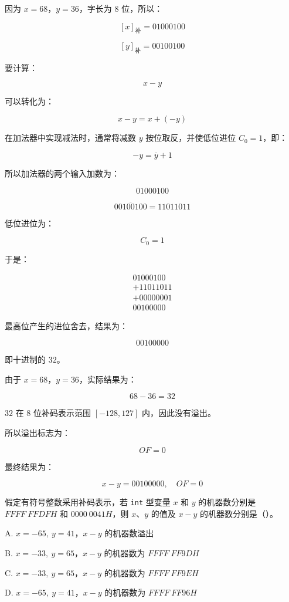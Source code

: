 \begin{analysisenv}
因为 $x=68$，$y=36$，字长为 $8$ 位，所以：

\[
[x]_{\text{补}} = 01000100
\]

\[
[y]_{\text{补}} = 00100100
\]

要计算：

\[
x-y
\]

可以转化为：

\[
x-y = x + (-y)
\]

在加法器中实现减法时，通常将减数 $y$ 按位取反，并使低位进位 $C_0=1$，即：

\[
-y = \overline{y} + 1
\]

所以加法器的两个输入加数为：

\[
01000100
\]

\[
\overline{00100100}=11011011
\]

低位进位为：

\[
C_0=1
\]

于是：

\[
\begin{array}{r}
01000100 \\
+11011011 \\
+00000001 \\
\hline
00100000
\end{array}
\]

最高位产生的进位舍去，结果为：

\[
00100000
\]

即十进制的 $32$。

由于 $x=68$，$y=36$，实际结果为：

\[
68-36=32
\]

$32$ 在 $8$ 位补码表示范围 $[-128,127]$ 内，因此没有溢出。

所以溢出标志为：

\[
OF=0
\]

最终结果为：

\[
x-y = 00100000,\quad OF=0
\]
\end{analysisenv}




\begin{question}
假定有符号整数采用补码表示，若 \texttt{int} 型变量 $x$ 和 $y$ 的机器数分别是 $FFFF\ FFDFH$ 和 $0000\ 0041H$，则 $x$、$y$ 的值及 $x-y$ 的机器数分别是（）。

A. $x=-65,\ y=41$，$x-y$ 的机器数溢出

B. $x=-33,\ y=65$，$x-y$ 的机器数为 $FFFF\ FF9DH$

C. $x=-33,\ y=65$，$x-y$ 的机器数为 $FFFF\ FF9EH$

D. $x=-65,\ y=41$，$x-y$ 的机器数为 $FFFF\ FF96H$
\end{question}

